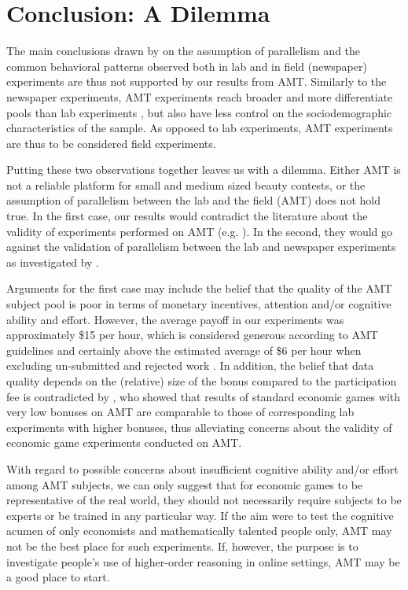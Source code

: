 \documentclass[12pt,review]{elsarticle}
\begin{document}
\section{Conclusion: A Dilemma\label{sec:Conclusion}}
\noindent
The main conclusions drawn by \cite{NagelEtAl02} on the assumption of parallelism and the common behavioral patterns observed both in lab and in field (newspaper) experiments are thus not supported by our results from AMT. Similarly to the newspaper experiments, AMT experiments reach broader and more differentiate pools than lab experiments \citep{BuhrmesterEtAl2011,CrumpEtAl13,HortonEtAl2011,Rand2012}, but also have less control on the sociodemographic characteristics of the sample. As opposed to lab experiments, AMT experiments are
thus to be considered field experiments. 

Putting these two observations together leaves us with a dilemma. Either AMT is not a reliable platform for small and medium sized beauty contests, or the assumption of parallelism between the lab and the field (AMT) does not hold true. In the first case, our results would contradict the literature about the validity of experiments performed on AMT (e.g. \cite{BuhrmesterEtAl2011,CrumpEtAl13,HortonEtAl2011,Rand2012}). In the second, they would go against the validation of parallelism between the lab and newspaper experiments as investigated by \cite{NagelEtAl02}. 

Arguments for the first case may include the belief that the quality of the AMT subject pool is poor in terms of monetary incentives, attention and/or cognitive ability and effort. However, the average payoff in our experiments was approximately \$15 per hour, which is considered generous according to AMT guidelines and certainly above the estimated average of \$6 per hour when excluding un-submitted and rejected work \citep{HaraEtAl18}. In addition, the belief that data quality depends on the (relative) size of the bonus compared to the participation fee is contradicted by \cite{amir2012economic}, who showed that results of standard economic games with very low bonuses on AMT are comparable to those of corresponding lab experiments with higher bonuses, thus alleviating concerns about the validity of economic game experiments conducted on AMT. 

With regard to possible concerns about insufficient cognitive ability and/or effort among AMT subjects, we can only suggest that for economic games to be representative of the real world, they should not necessarily require subjects to be experts or be trained in any particular way. If the aim were to test the cognitive acumen of only economists and mathematically talented people only, AMT may not be the best place for such experiments. If, however, the purpose is to investigate people's use of higher-order reasoning in online settings, AMT may be a good place to start. 
\end{document}
